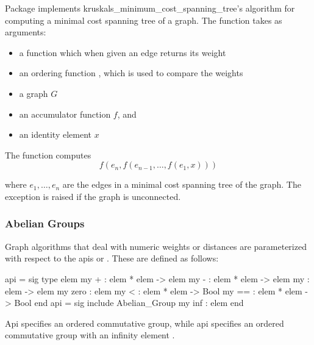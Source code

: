 Package  implements kruskals_minimum_cost_spanning_tree's algorithm for
computing a minimal cost spanning tree of a graph.
The function  takes as arguments:
\begin{itemize}
\item a  function which when given an edge returns its weight
\item an ordering function \sml{<}, which is used to compare the weights
\item a graph $G$
\item an accumulator function $f$, and
\item an identity element $x$
\end{itemize}
The function  computes
\[
   f(e_{n},f(e_{n-1},\ldots, f(e_1,x))) 
\]

where $e_1,\ldots,e_n$ are the edges in a minimal cost spanning tree 
of the graph.
The exception  is raised if the graph is unconnected.

\subsubsection{Abelian Groups}
  Graph algorithms that deal with numeric weights or distances
are parameterized with respect to the apis
 or .
These are defined as follows:
\begin{SML}
 api  = sig 
   type elem 
   my +    : elem * elem -> elem
   my -    : elem * elem -> elem
   my      : elem -> elem
   my zero : elem
   my <    : elem * elem -> Bool
   my ==   : elem * elem -> Bool
 end
 api  = sig
   include Abelian_Group
   my inf : elem
 end
\end{SML}
Api  specifies an ordered commutative group,
while api  specifies an ordered commutative
group with an infinity element . 

